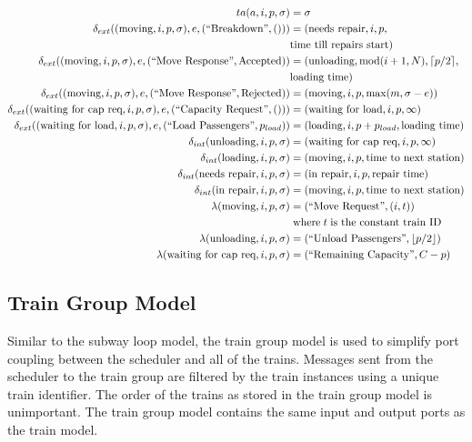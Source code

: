 \begin{align*}
    ta(a, i, p, \sigma) &= \sigma \\
    \delta_{ext}((\text{moving}, i, p, \sigma), e, \InBreakDown) &= 
        (\text{needs repair}, i, p, \\
        & \text{time till repairs start}) \\
    \delta_{ext}((\text{moving}, i, p, \sigma), e, \InMoveRes{\text{Accepted}})
        &= (\text{unloading}, \Mod{i+1}{N}, \ceil*{p/2}, \\
        & \text{loading time}) \\
    \delta_{ext}((\text{moving}, i, p, \sigma), e, \InMoveRes{\text{Rejected}})
        &= (\text{moving}, i, p, \max(m, \sigma - e)) \\
    \delta_{ext}((\text{waiting for cap req}, i, p, \sigma), e, \InCapReq) &=
        (\text{waiting for load}, i, p, \infty) \\
    \delta_{ext}((\text{waiting for load}, i, p, \sigma), e, \InLoadPassengers{p_{load}}) &=
        (\text{loading}, i, p + p_{load}, \text{loading time}) \\
    \delta_{int}(\text{unloading}, i, p, \sigma) &= 
        (\text{waiting for cap req}, i, p, \infty) \\
    \delta_{int}(\text{loading}, i, p, \sigma) &= (\text{moving}, i, p,
        \text{time to next station}) \\
    \delta_{int}(\text{needs repair}, i, p, \sigma) &= 
        (\text{in repair}, i, p, \text{repair time}) \\
    \delta_{int}(\text{in repair}, i, p, \sigma) &= 
        (\text{moving}, i, p, \text{time to next station}) \\
    \lambda(\text{moving}, i, p, \sigma) &= \OutMoveReq{(i, t)} \\ 
        & \text{\;where\;} t \text{\;is the constant train ID} \\
    \lambda(\text{unloading}, i, p, \sigma) &= \OutUnloadPassengers{\floor*{p/2}} \\
    \lambda(\text{waiting for cap req}, i, p, \sigma) &= \OutRemainingCapacity{C - p}
\end{align*}
%
\subsection{Train Group Model}
Similar to the subway loop model, the train group model is used to simplify port coupling between the scheduler and all of the trains.  Messages sent from the scheduler to the train group are filtered by the train instances using a unique train identifier.  The order of the trains as stored in the train group model is unimportant.  The train group model contains the same input and output ports as the train model.

